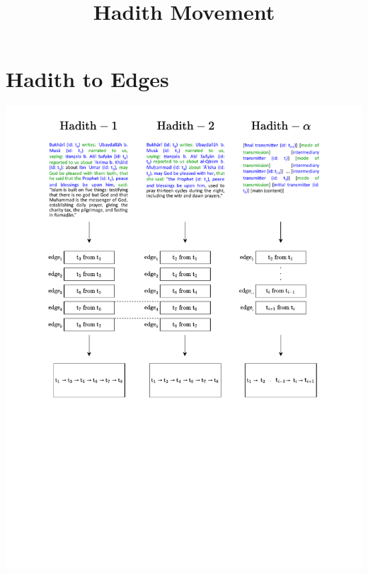 \documentclass[12pt,english]{article}
\title{\textbf{Hadith Movement}}
\date{}
\begin{document}
\maketitle

\section{Hadith to Edges}
\vspace*{-0.4cm}
\hspace*{-2cm}
\includegraphics[scale=0.9]{hadith-to-edges/b0_hadith_to_edges.pdf}

\newpage
\end{document}
